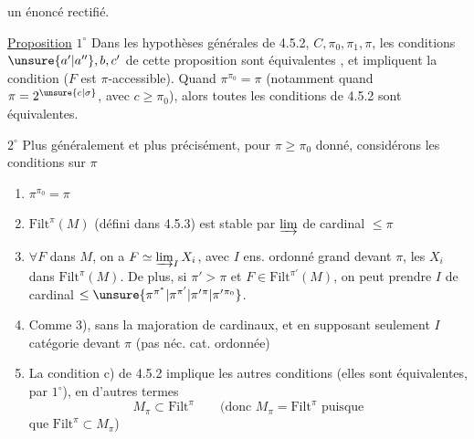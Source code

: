  un énoncé rectifié.

\uline{Proposition}  \textcircled{$1^\circ$} Dans les hypothèses générales de 4.5.2,  $C,\pi_0,\pi_1,\pi$, les conditions $\unsure{a'|a''},b,c'$ de  cette proposition sont équivalentes , et impliquent la condition ($F$ est $\pi$-accessible). Quand $\pi^{\pi_0}=\pi$ (notamment quand $\pi=2^{\unsure{c|\sigma}}$, avec $c\geq\pi_0$), alors toutes les conditions  de 4.5.2 sont équivalentes.


\textcircled{$2^\circ$} Plus généralement et plus précisément,  pour $\pi\geq\pi_0$ donné,  considérons les conditions sur $\pi$
\begin{enumerate}[label=\arabic*)]
\item $\pi^{\pi_0}=\pi$
\item $\mathrm{Filt}^{\pi}(M)$ (défini dans 4.5.3) est stable par $\varinjlim$ de cardinal $\leq\pi$
\item $\forall F$ dans $M$, on a $F\simeq\varinjlim_I X_i$, avec $I$ ens. ordonné grand devant $\pi$, les $X_i$ dans $\mathrm{Filt}^{\pi}(M)$. De plus, si $\pi'>\pi$ et $F\in\mathrm{Filt}^{\pi'}(M)$, on peut prendre $I$ de cardinal $\leq\unsure{\pi^{\pi^*}|\pi^{\pi'}|\pi'{}^{\pi}|\pi'{}^{\pi_0}}$.
\item Comme 3), sans la majoration de cardinaux, et  en supposant seulement $I$ catégorie  devant $\pi$ (pas néc. cat. ordonnée)
\item La condition c) de 4.5.2 implique les autres conditions (elles sont équivalentes, par $1^\circ$), en d'autres termes
\[
M_\pi\subset\mathrm{Filt}^{\pi}\qquad(\text{donc }M_\pi=\mathrm{Filt}^{\pi}\text{ puisque}
\]
 que $\mathrm{Filt}^{\pi}\subset M_\pi$)
\end{enumerate}
